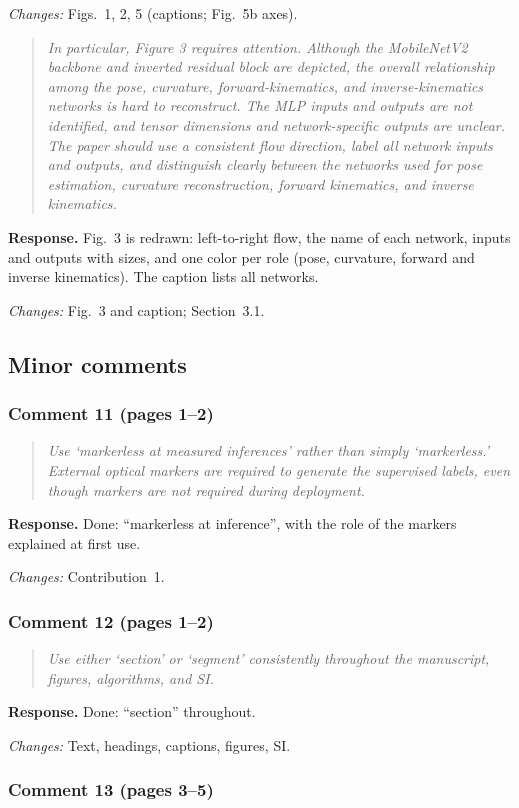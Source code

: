 \documentclass[11pt,a4paper]{article}
\newcommand{\rc}[1]{\begin{quote}\color{black!70}\itshape #1\end{quote}}
\begin{document}
\textit{Changes:} Figs.~1, 2, 5 (captions; Fig.~5b axes).

\rc{In particular, Figure 3 requires attention. Although the MobileNetV2 backbone and inverted residual block are depicted, the overall relationship among the pose, curvature, forward-kinematics, and inverse-kinematics networks is hard to reconstruct. The MLP inputs and outputs are not identified, and tensor dimensions and network-specific outputs are unclear. The paper should use a consistent flow direction, label all network inputs and outputs, and distinguish clearly between the networks used for pose estimation, curvature reconstruction, forward kinematics, and inverse kinematics.}
\textbf{Response.} Fig.~3 is redrawn: left-to-right flow, the name of each network, inputs and outputs with sizes, and one color per role (pose, curvature, forward and inverse kinematics). The caption lists all networks.

\textit{Changes:} Fig.~3 and caption; Section~3.1.

\subsection*{Minor comments}

\subsubsection*{Comment 11 (pages 1--2)}

\rc{Use `markerless at measured inferences' rather than simply `markerless.' External optical markers are required to generate the supervised labels, even though markers are not required during deployment.}
\textbf{Response.} Done: ``markerless at inference'', with the role of the markers explained at first use.

\textit{Changes:} Contribution~1.

\subsubsection*{Comment 12 (pages 1--2)}

\rc{Use either `section' or `segment' consistently throughout the manuscript, figures, algorithms, and SI.}
\textbf{Response.} Done: ``section'' throughout.

\textit{Changes:} Text, headings, captions, figures, SI.

\subsubsection*{Comment 13 (pages 3--5)}
\end{document}
